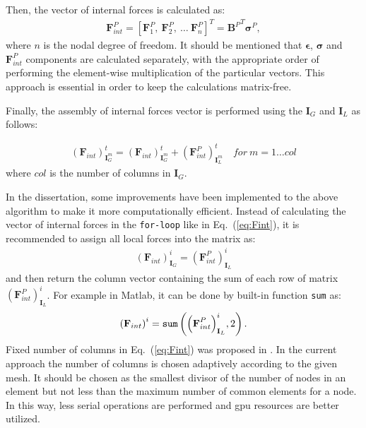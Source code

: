 Then, the vector of internal forces is calculated as:
\begin{eqnarray}
	\label{eq:forces}
	\textbf{F}^P_{int}=\left[\textbf{F}^P_1,\ \textbf{F}^P_2,\ \ldots\ \textbf{F}^P_{n} \right]^T={\textbf{B}^P}^T\boldsymbol{\sigma}^P,
\end{eqnarray}
where $n$ is the nodal degree of freedom.
It should be mentioned that \(\boldsymbol{\epsilon}\), \(\boldsymbol{\sigma}\) and \(\textbf{F}^P_{int}\) components are calculated separately, with the appropriate order of performing the element-wise multiplication of the particular vectors.
This approach is essential in order to keep the calculations matrix-free.

Finally, the assembly of internal forces vector is performed using the \(\textbf{I}_G\) and \(\textbf{I}_L\) as follows:

\begin{eqnarray}
	\label{eq:Fint}
	{\left(\textbf{F}_{int}\right)}^t_{\textbf{I}^m_G} = {\left(\textbf{F}_{int}\right)}^t_{\textbf{I}^m_G} + {\left(\textbf{F}^P_{int}\right)}^t_{\textbf{I}^m_L}\quad for\ m=1\ldots col 
\end{eqnarray}
where \(col\) is the number of columns in \(\textbf{I}_G\).

In the dissertation, some improvements have been implemented to the above algorithm to make it more computationally efficient.
Instead of calculating the vector of internal forces in the \verb+for-loop+ like in Eq.~(\ref{eq:Fint}), it is recommended to assign all local forces into the matrix as:
\begin{eqnarray}
	\label{eq:Fmatrix}
	{\left(\textbf{F}_{int}\right)}^i_{\textbf{I}_G} ={\left(\textbf{F}^P_{int}\right)}^i_{\textbf{I}_L}
\end{eqnarray}
and then return the column vector containing the sum of each row of matrix \({\left(\textbf{F}^P_{int}\right)}^i_{\textbf{I}_L}\).
For example in Matlab, it can be done by built-in function \verb|sum| as:
\begin{eqnarray}
	\label{eq:Fsum}
	{\left(\textbf{F}_{int}\right)}^i = \verb|sum| \left({\left(\textbf{F}^P_{int}\right)}^i_{\textbf{I}_L},2\right).
\end{eqnarray}
Fixed number of columns in Eq.~(\ref{eq:Fint}) was proposed in \cite{kudela2016parallel}.
In the current approach the number of columns is chosen adaptively according to the given mesh.
It should be chosen as the smallest divisor of the number of nodes in an element but not less than the maximum number of common elements for a node.
In this way, less serial operations are performed and \ac{gpu} resources are better utilized.

